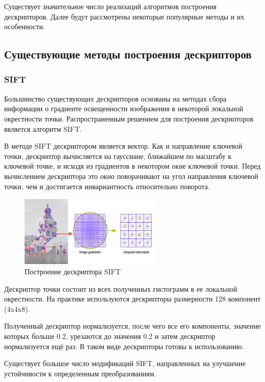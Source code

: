 {{	Существует значительное число реализаций алгоритмов построения дескрипторов. Далее будут рассмотрены некоторые популярные методы и их особенности.
	
\newpage
\subsection{Существующие методы построения дескрипторов}{
	
	\subsubsection{SIFT}{
	Большинство существующих дескрипторов основаны на методах сбора информации о градиенте освещенности изображения в некоторой локальной окрестности точки. 
	Распространенным решением для построения дескрипторов является алгоритм SIFT. 
	
	В методе SIFT дескриптором является вектор. Как и направление ключевой точки, дескриптор вычисляется на гауссиане, ближайшем по масштабу к ключевой точке, и исходя из градиентов в некотором окне ключевой точки. Перед вычислением дескриптора это окно поворачивают на угол направления ключевой точки, чем и достигается инвариантность относительно поворота.
	
	\begin{figure}[H]
		\centering                             
		\includegraphics[width=0.6\textwidth,keepaspectratio]{daisy/SIFT.jpg}       
		\centering\caption{ Построение дескриптора SIFT }
		\label{gradient_example}                           
	\end{figure}    
	
	Дескриптор точки состоит из всех полученных гистограмм в ее локальной окрестности. На практике используются дескрипторы размерности 128 компонент (4x4x8).
	
	Полученный дескриптор нормализуется, после чего все его компоненты, значение которых больше 0.2, урезаются до значения 0.2 и затем дескриптор нормализуется ещё раз. В таком виде дескрипторы готовы к использованию.
	
	Существует большое число модификаций SIFT, направленных на улучшение устойчивости к определенным преобразованиям. 
	}
}}}
